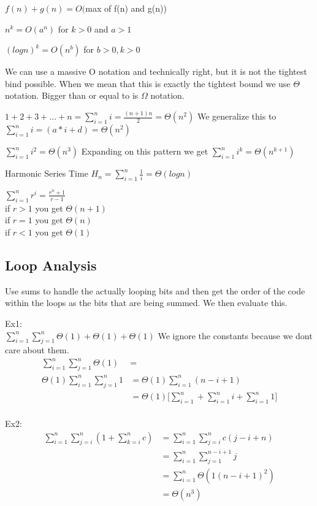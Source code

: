 \documentclass[12pt]{article}
\begin{document}
$f(n)+g(n) = O($max of f(n) and g(n))

$n^k = O(a^n)$ for $k>0$ and $a>1$

$(log n)^k = O(n^b)$ for $b>0, k>0$

We can use a massive O notation and technically right, but it is not the tightest bind possible. When we mean that this is exactly the tightest bound we use $\Theta$ notation. Bigger than or equal to is $\Omega$ notation.

$1+2+3+...+n = \displaystyle\sum_{i=1}^{n} i = \frac{(n+1)n}{2} = \Theta(n^2)$
We generalize this to
$\displaystyle\sum_{i=1}^{n} i = (a*i+d) = \Theta(n^2)$

$\displaystyle\sum_{i=1}^{n} i^2 = \Theta(n^3)$
Expanding on this pattern we get
$\displaystyle\sum_{i=1}^{n} i^k = \Theta(n^{k+1})$

Harmonic Series Time
$H_{n} = \displaystyle\sum_{i=1}^{n} \frac{1}{i} = \Theta(log n)$

$\displaystyle\sum_{i=1}^{n} r^i = \frac{r^n+1}{r-1}$\\
if $r>1$ you get $\Theta(n+1)$\\
if $r=1$ you get $\Theta(n)$\\
if $r<1$ you get $\Theta(1)$

\subsection*{Loop Analysis}
Use sums to handle the actually looping bits and then get the order of the code within the loops as the bits that are being summed. We then evaluate this.

Ex1:\\
$\displaystyle\sum_{i=1}^n \displaystyle\sum_{j=1}^n \Theta (1) + \Theta (1) + \Theta (1)$
We ignore the constants because we dont care about them. 
\begin{align*}
\displaystyle\sum_{i=1}^n \displaystyle\sum_{j=1}^n \Theta (1) &= \\ 
 \Theta (1) \displaystyle\sum_{i=1}^n \displaystyle\sum_{j=1}^n 1 &= \Theta (1) \displaystyle\sum_{i=1}^n (n-i+1)\\
 &= \Theta (1) \bigg [ \displaystyle\sum_{i=1}^n + \displaystyle\sum_{i=1}^n i + \displaystyle\sum_{i=1}^n 1 \bigg ]\\
\end{align*}

Ex2:
\begin{align*}
\displaystyle\sum_{i=1}^n \displaystyle\sum_{j=i}^n (1 + \displaystyle\sum_{k=i}^n c) &= \displaystyle\sum_{i=1}^n \displaystyle\sum_{j=i}^n c(j-i + n)\\
&= \displaystyle\sum_{i=1}^n \displaystyle\sum_{j=1}^{n-i+1}j\\
&= \displaystyle\sum_{i=1}^n \Theta (1(n-i+1)^2)\\
&= \Theta (n^3)
\end{align*}
\end{document}
